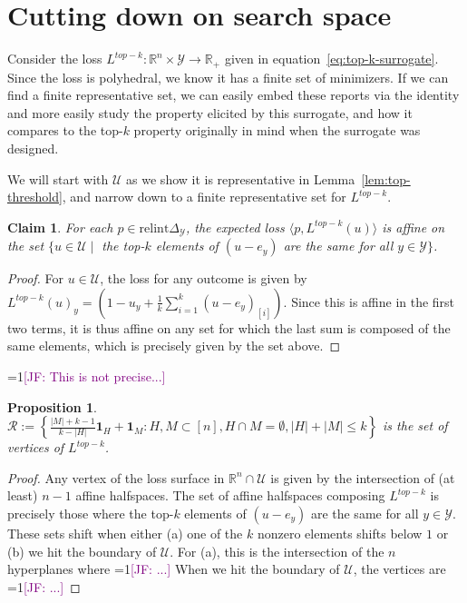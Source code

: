 \documentclass[12pt]{article}
\newcommand{\Comments}{1}
\newcommand{\mynote}[2]{\ifnum\Comments=1\textcolor{#1}{#2}\fi}
\newcommand{\jessie}[1]{\mynote{purple}{[JF: #1]}}
\newcommand{\reals}{\mathbb{R}}
\newcommand{\simplex}{\Delta_\Y}
\newcommand{\R}{\mathcal{R}}
\newcommand{\U}{\mathcal{U}}
\newcommand{\Y}{\mathcal{Y}}
\newcommand{\inprod}[2]{\langle #1, #2 \rangle}%
\newtheorem{proposition}{Proposition}
\newtheorem{claim}{Claim}
\begin{document}
\section{Cutting down on search space}
Consider the loss $L^{top-k} : \reals^n \times \Y \to \reals_+$ given in equation~\eqref{eq:top-k-surrogate}.
Since the loss is polyhedral, we know it has a finite set of minimizers.
If we can find a finite representative set, we can easily embed these reports via the identity and more easily study the property elicited by this surrogate, and how it compares to the top-$k$ property originally in mind when the surrogate was designed.

We will start with $\U$ as we show it is representative in Lemma~\ref{lem:top-threshold}, and narrow down to a finite representative set for $L^{top-k}$.

\begin{claim}
	For each $p \in \mathrm{relint}\simplex$, the expected loss $\inprod{p}{L^{top-k}(u)}$ is affine on the set $\{u \in \U \mid $ the top-$k$ elements of $(u - e_y)$ are the same for all $ y \in \Y\}$.
\end{claim}
\begin{proof}
	For $u \in \U$, the loss for any outcome is given by $L^{top-k}(u)_y = \left(1 - u_y + \frac 1 k \sum_{i = 1}^k(u - e_y)_{[i]}\right)$.
	Since this is affine in the first two terms, it is thus affine on any set for which the last sum is composed of the same elements, which is precisely given by the set above.
\end{proof}

\jessie{This is not precise...}
\begin{proposition}
	$\R := \left\{ \frac{|M| + k -1}{k - |H|} \mathbf{1}_H + \mathbf{1}_M : H, M \subset [n], H\cap M = \emptyset, |H| + |M| \leq k \right\}$ is the set of vertices of $L^{top-k}$.
\end{proposition}
\begin{proof}
	Any vertex of the loss surface in $\reals^n \cap \U$ is given by the intersection of (at least) $n-1$ affine halfspaces.
	The set of affine halfspaces composing $L^{top-k}$ is precisely those where the top-$k$ elements of $(u - e_y)$ are the same for all $y \in \Y$.
	These sets shift when either (a) one of the $k$ nonzero elements shifts below $1$ or (b) we hit the boundary of $\U$.
	For (a), this is the intersection of the $n$ hyperplanes where \jessie{...}
	When we hit the boundary of $\U$, the vertices are \jessie{...}
\end{proof}
\end{document}
